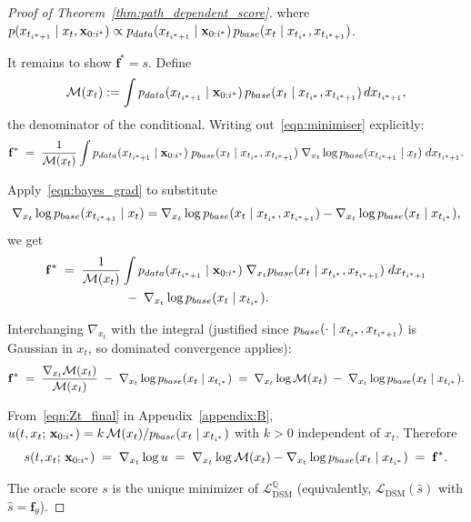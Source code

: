 \documentclass{article}
\newcommand{\pdata}{p_{\normalfont{data}}}
\newcommand{\pbase}{p_{\normalfont{base}}}
\newcommand{\QQ}{\mathbb{Q}}
\begin{document}
\begin{proof}[Proof of Theorem~\ref{thm:path_dependent_score}]
where $p(x_{t_{i^*+1}} \mid x_t, \mathbf{x}_{0:i^*}) \propto \pdata(x_{t_{i^*+1}} \mid \mathbf{x}_{0:i^*})\,\pbase(x_t \mid x_{t_{i^*}}, x_{t_{i^*+1}})$.

It remains to show $\mathbf{f}^* = s$.  Define $$\mathcal{M}(x_t) := \int \pdata(x_{t_{i^*+1}} \mid \mathbf{x}_{0:i^*})\,\pbase(x_t \mid x_{t_{i^*}}, x_{t_{i^*+1}})\,dx_{t_{i^*+1}},$$ the denominator of the conditional.  Writing out~\eqref{eqn:minimiser} explicitly:
\[
  \mathbf{f}^*
  \;=\;
  \frac{1}{\mathcal{M}(x_t)}
  \int
    \pdata(x_{t_{i^*+1}} \mid \mathbf{x}_{0:i^*})\;
    \pbase(x_t \mid x_{t_{i^*}}, x_{t_{i^*+1}})\;
    \nabla_{x_t}\log \pbase(x_{t_{i^*+1}} \mid x_t)\;
  dx_{t_{i^*+1}}.
\]

Apply~\eqref{eqn:bayes_grad} to substitute $$\nabla_{x_t}\log\pbase(x_{t_{i^*+1}}\mid x_t) = \nabla_{x_t}\log\pbase(x_t\mid x_{t_{i^*}},x_{t_{i^*+1}}) - \nabla_{x_t}\log\pbase(x_t\mid x_{t_{i^*}}),$$ we get
\begin{align*}
  \mathbf{f}^*
  \;=\;
  \frac{1}{\mathcal{M}(x_t)}
  &\int
    \pdata(x_{t_{i^*+1}} \mid \mathbf{x}_{0:i^*})\;
    \nabla_{x_t}\pbase(x_t \mid x_{t_{i^*}}, x_{t_{i^*+1}})\;
  dx_{t_{i^*+1}} \\
  &\;-\;
  \nabla_{x_t}\log \pbase(x_t \mid x_{t_{i^*}}).
\end{align*}

Interchanging $\nabla_{x_t}$ with the integral (justified since $\pbase(\cdot \mid x_{t_{i^*}}, x_{t_{i^*+1}})$ is Gaussian in $x_t$, so dominated convergence applies):
\begin{equation}\label{eqn:score_equals_f}
  \mathbf{f}^*
  \;=\;
  \frac{\nabla_{x_t}\mathcal{M}(x_t)}{\mathcal{M}(x_t)}
  \;-\;
  \nabla_{x_t}\log \pbase(x_t \mid x_{t_{i^*}})
  \;=\;
  \nabla_{x_t}\log \mathcal{M}(x_t)
  \;-\;
  \nabla_{x_t}\log \pbase(x_t \mid x_{t_{i^*}}).
\end{equation}

From~\eqref{eqn:Zt_final} in Appendix~\ref{appendix:B},
$u(t, x_t;\, \mathbf{x}_{0:i^*}) = k\,\mathcal{M}(x_t)/\pbase(x_t \mid x_{t_{i^*}})$ with $k > 0$ independent of $x_t$.  Therefore
\[
  s(t, x_t;\, \mathbf{x}_{0:i^*})
  \;=\;
  \nabla_{x_t}\log u
  \;=\;
  \nabla_{x_t}\log \mathcal{M}(x_t) - \nabla_{x_t}\log \pbase(x_t \mid x_{t_{i^*}})
  \;=\;
  \mathbf{f}^*.
\]

The oracle score $s$ is the unique minimizer of $\mathcal{L}_\mathrm{DSM}^\QQ$ (equivalently, $\mathcal{L}_\text{DSM}(\hat{s})$ with $\hat{s} = \mathbf{f}_\theta$).
\end{proof}
\end{document}
